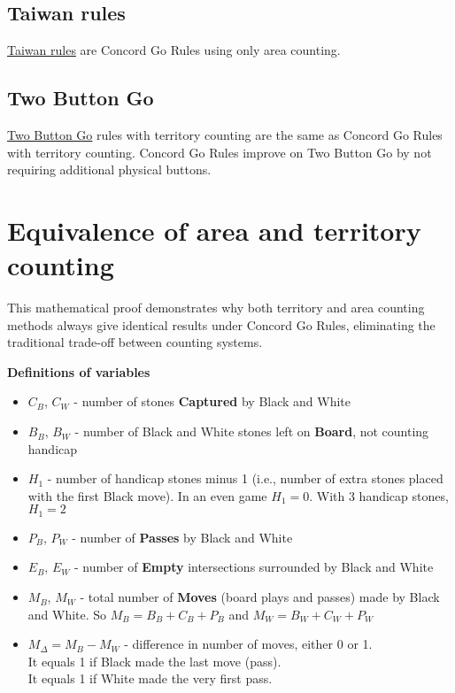 \documentclass[11pt]{article}
\begin{document}
\subsection*{Taiwan rules}
\href{https://senseis.xmp.net/?TaiwanRules}{Taiwan rules} are Concord Go Rules using only area counting.

\subsection*{Two Button Go}
\href{https://senseis.xmp.net/?TwoButtonGo}{Two Button Go} rules with territory counting are the same as Concord Go Rules with territory counting.
Concord Go Rules improve on Two Button Go by not requiring additional physical buttons.


\newpage
\section*{Equivalence of area and territory counting}

This mathematical proof demonstrates why both territory and area counting methods always give identical results under Concord Go Rules, eliminating the traditional trade-off between counting systems.

\textbf{Definitions of variables}

\begin{itemize}
\item $C_B$, $C_W$ - number of stones \textbf{Captured} by Black and White
\item $B_B$, $B_W$ - number of Black and White stones left on \textbf{Board}, not counting handicap
\item $H_1$ - number of handicap stones minus 1 (i.e., number of extra stones placed with the first Black move).
In an even game $H_1 = 0$. With 3 handicap stones, $H_1 = 2$
\item $P_B$, $P_W$ - number of \textbf{Passes} by Black and White
\item $E_B$, $E_W$ - number of \textbf{Empty} intersections surrounded by Black and White
\item $M_B$, $M_W$ - total number of \textbf{Moves} (board plays and passes) made by Black and White.
So $M_B = B_B + C_B + P_B$ and $M_W = B_W + C_W + P_W$
\item $M_\Delta = M_B - M_W$ - difference in number of moves, either 0 or 1. \\
It equals 1 if Black made the last move (pass).\\
It equals 1 if White made the very first pass.
\end{itemize}
\end{document}
